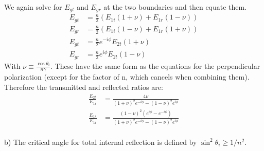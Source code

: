 \documentclass[a4paper,11pt]{article}
\numberwithin{equation}{section}
\newcommand{\lrp}[1]{\left({#1}\right)}
\begin{document}
We again solve for $E_{gt}$ and $E_{gr}$ at the two boundaries and then equate them.
\begin{align}
 E_{gt} &= \frac{n}{2}\lrp{E_{1i}(1+\nu)+E_{1r}(1-\nu)}\\
 E_{gr} &= \frac{n}{2}\lrp{E_{1i}(1-\nu)+E_{1r}(1+\nu)}\\
 E_{gt} &= \frac{n}{2}e^{-i\phi}E_{2t}(1+\nu)\\
 E_{gr} &= \frac{n}{2}e^{i\phi}E_{2t}(1-\nu)
\end{align}
With $\nu \equiv \frac{\cos{\theta_i}}{n\gamma}$.
These have the same form as the equations for the perpendicular polarization (except for the factor of n, which cancels when combining them).
Therefore the transmitted and reflected ratios are:
\begin{align}
 \frac{E_{2t}}{E_{1i}} &= \frac{4\nu}{(1+\nu)^2e^{-i\phi}-(1-\nu)^2e^{i\phi}}\\
 \frac{E_{1r}}{E_{1i}} &= \frac{(1-\nu)^2(e^{i\phi}-e^{-i\phi})}{(1+\nu)^2e^{-i\phi}-(1-\nu)^2e^{i\phi}}
\end{align}
\\
b) The critical angle for total internal reflection is defined by $\sin^2{\theta_i} \ge 1/n^2$.
\end{document}
